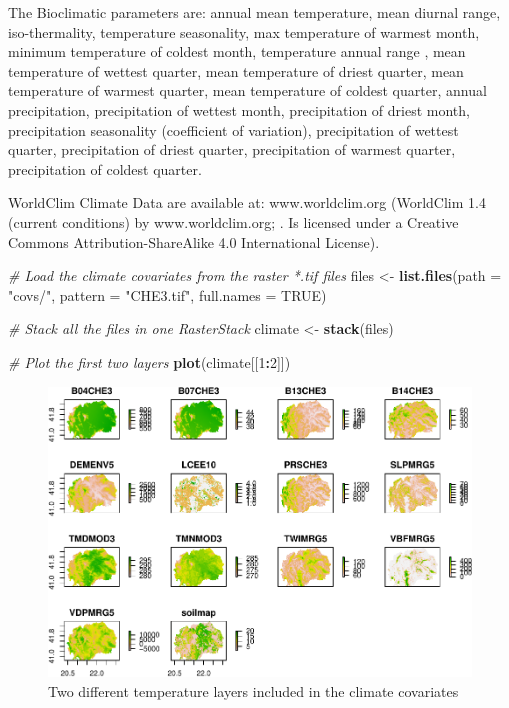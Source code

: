 \documentclass[10pt,b5paper,]{book}
\newenvironment{Shaded}{\begin{snugshade}}{\end{snugshade}}
\newcommand{\CommentTok}[1]{\textcolor[rgb]{0.56,0.35,0.01}{\textit{#1}}}
\newcommand{\DataTypeTok}[1]{\textcolor[rgb]{0.13,0.29,0.53}{#1}}
\newcommand{\DecValTok}[1]{\textcolor[rgb]{0.00,0.00,0.81}{#1}}
\newcommand{\KeywordTok}[1]{\textcolor[rgb]{0.13,0.29,0.53}{\textbf{#1}}}
\newcommand{\NormalTok}[1]{#1}
\newcommand{\OperatorTok}[1]{\textcolor[rgb]{0.81,0.36,0.00}{\textbf{#1}}}
\newcommand{\OtherTok}[1]{\textcolor[rgb]{0.56,0.35,0.01}{#1}}
\newcommand{\StringTok}[1]{\textcolor[rgb]{0.31,0.60,0.02}{#1}}
\theoremstyle{definition}
\theoremstyle{definition}
\theoremstyle{definition}
\theoremstyle{remark}
\begin{document}
The Bioclimatic parameters are: annual mean temperature, mean diurnal
range, iso-thermality, temperature seasonality, max temperature of
warmest month, minimum temperature of coldest month, temperature annual
range , mean temperature of wettest quarter, mean temperature of driest
quarter, mean temperature of warmest quarter, mean temperature of
coldest quarter, annual precipitation, precipitation of wettest month,
precipitation of driest month, precipitation seasonality (coefficient of
variation), precipitation of wettest quarter, precipitation of driest
quarter, precipitation of warmest quarter, precipitation of coldest
quarter.

WorldClim Climate Data are available at: www.worldclim.org (WorldClim
1.4 (current conditions) by www.worldclim.org; \citet{hijmans2005very}.
Is licensed under a Creative Commons Attribution-ShareAlike 4.0
International License).

\begin{Shaded}
\begin{Highlighting}[]
\CommentTok{# Load the climate covariates from the raster *.tif files}
\NormalTok{files <-}\StringTok{ }\KeywordTok{list.files}\NormalTok{(}\DataTypeTok{path =} \StringTok{"covs/"}\NormalTok{, }\DataTypeTok{pattern =} \StringTok{"CHE3.tif"}\NormalTok{, }
                    \DataTypeTok{full.names =} \OtherTok{TRUE}\NormalTok{)}

\CommentTok{# Stack all the files in one RasterStack}
\NormalTok{climate <-}\StringTok{ }\KeywordTok{stack}\NormalTok{(files)}
\end{Highlighting}
\end{Shaded}

\begin{Shaded}
\begin{Highlighting}[]
\CommentTok{# Plot the first two layers}
\KeywordTok{plot}\NormalTok{(climate[[}\DecValTok{1}\OperatorTok{:}\DecValTok{2}\NormalTok{]])}
\end{Highlighting}
\end{Shaded}

\begin{figure}
\centering
\includegraphics{SOCMapping_files/figure-latex/unnamed-chunk-26-1.pdf}
\caption{\label{fig:unnamed-chunk-26}Two different temperature layers
included in the climate covariates}
\end{figure}
\end{document}

